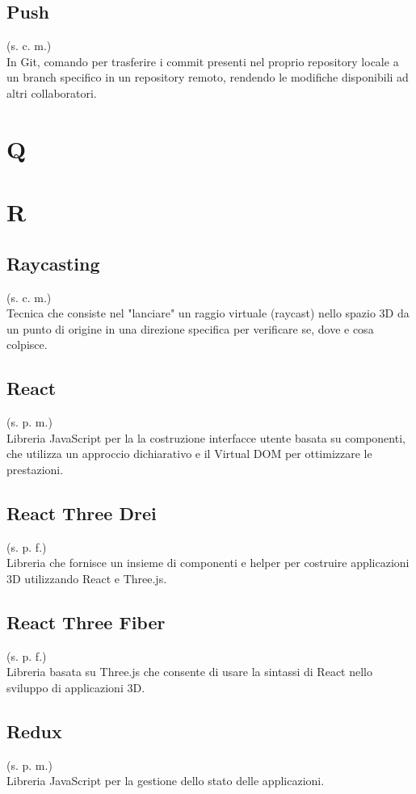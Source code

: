 \subsection{Push}
(s. c. m.)\\
In Git, comando per trasferire i commit presenti nel proprio repository locale a un
branch specifico in un repository remoto, rendendo le modifiche disponibili
ad altri collaboratori.

\pagebreak
\section{Q}
\pagebreak
\section{R}
\subsection{Raycasting}
(s. c. m.)\\
Tecnica che consiste nel "lanciare" un raggio virtuale (raycast) nello spazio 3D da un punto 
di origine in una direzione specifica per verificare se, dove e cosa colpisce.
\subsection{React}
(s. p. m.)\\
Libreria JavaScript per la la costruzione interfacce utente basata su componenti, che utilizza un
approccio dichiarativo e il Virtual DOM per ottimizzare le prestazioni.
\subsection{React Three Drei}
\label{React Three Drei}
(s. p. f.)\\
Libreria che fornisce un insieme di componenti e helper per
costruire applicazioni 3D utilizzando React e Three.js.
\subsection{React Three Fiber}
\label{React Three Fiber}
(s. p. f.)\\
Libreria basata su Three.js che consente di usare la sintassi
di React nello sviluppo di applicazioni 3D.
\subsection{Redux}
(s. p. m.)\\
Libreria JavaScript per la gestione dello stato delle applicazioni.
